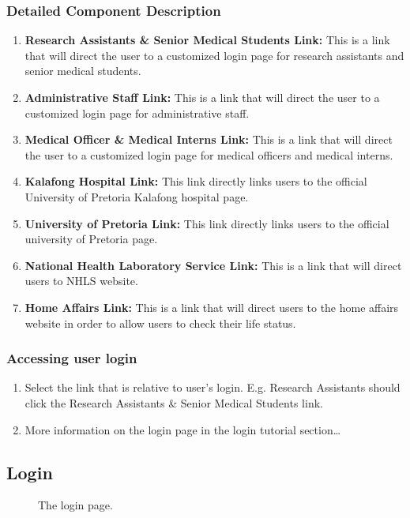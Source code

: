 \documentclass[14pt, a4paper]{article}
\begin{document}
	\subsubsection{Detailed Component Description}
		\begin{enumerate}
			\item \textbf{Research Assistants \& Senior Medical Students Link:} This is a link that will direct the user to a customized login page for research assistants and senior medical students.
			\item \textbf{Administrative Staff Link:} This is a link that will direct the user to a customized login page for administrative staff.
			\item \textbf{Medical Officer \& Medical Interns Link:} This is a link that will direct the user to a customized login page for medical officers and medical interns.
			\item \textbf{Kalafong Hospital Link:} This link directly links users to the official University of Pretoria Kalafong hospital page.
			\item \textbf{University of Pretoria Link: } This link directly links users to the official university of Pretoria page.
			\item \textbf{National Health Laboratory Service Link:} This is a link that will direct users to NHLS website.
			\item \textbf{Home Affairs Link:} This is a link that will direct users to the home affairs website in order to allow users to check their life status.
		\end{enumerate}
	\subsubsection{Accessing user login}
		\begin{enumerate}
			\item Select the link that is relative to user's login. E.g. Research Assistants should click the Research Assistants \& Senior Medical Students link.
			\item More information on the login page in the login tutorial section\ldots
		\end{enumerate}
\subsection{Login}
	\begin{figure}[H]
		\caption{The login page.}
		\label{fig:login1}
	\end{figure}
\end{document}
